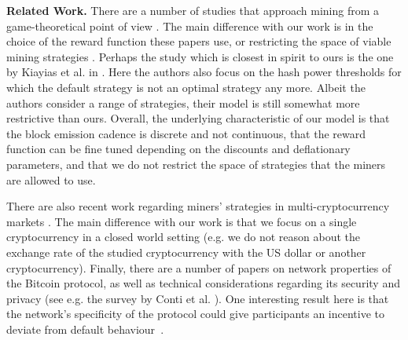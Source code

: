

\smallskip
\noindent
{\bf Related Work.} There are a number of studies that approach mining from a game-theoretical point of view \cite{economics_of_mining2013,selfishmining2014,optimalselfishmining2017,biais2018blockchain,mininggames:2016,instabilitywithoutreward:2016}. The main difference with our work is in the choice of the reward function \cite{economics_of_mining2013,selfishmining2014,optimalselfishmining2017,biais2018blockchain,instabilitywithoutreward:2016} these papers use, or restricting the space of viable mining strategies \cite{economics_of_mining2013,selfishmining2014,optimalselfishmining2017}. Perhaps the study which is closest in spirit to ours is the one by Kiayias et al. in \cite{mininggames:2016}. 
Here the authors also focus on the hash power thresholds for which the default strategy is not an optimal strategy any more. Albeit the authors consider a range of strategies, their model is still somewhat more restrictive than ours. Overall, the underlying characteristic of our model is that the block emission cadence is discrete and not continuous, that the reward function can be fine tuned depending on the discounts and deflationary parameters, and that we do not restrict the space of strategies that the miners are allowed to use.

There are also recent work regarding miners' strategies in multi-cryptocurrency markets \cite{dhamal2018stochastic,spiegelman2018game}. The main difference with our work is that we focus on a single cryptocurrency in a closed world setting (e.g. we do not reason about  the exchange rate of the studied cryptocurrency with the US dollar or another cryptocurrency). Finally, there are a number of papers on network properties of the Bitcoin protocol, as well as technical considerations regarding its security and privacy (see e.g. the survey by Conti et al. \cite{conti2018survey}). One interesting result here is that the network's specificity of the protocol could give participants an incentive to deviate from default behaviour~\cite{bitcoin_attacks_2013,ddos_attacks2014,empirical_dos_attacks2014}.  


